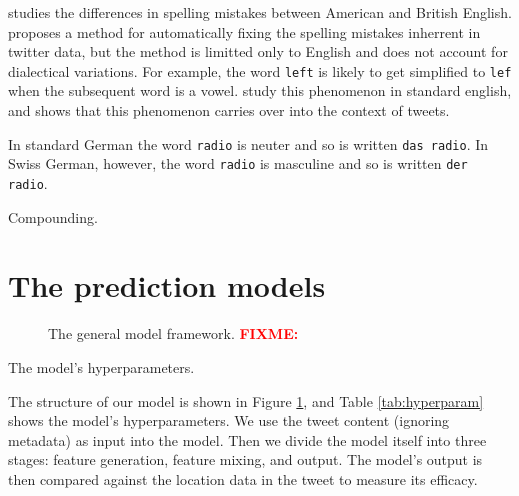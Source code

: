 \documentclass[sigconf,10pt]{acmart}
\newcommand{\str}[1]{\texttt{#1}}
\newcommand{\fixme}[1]{\textcolor{red}{\textbf{FIXME:} {#1}}}
\begin{document}
\begin{description}[style=unboxed,leftmargin=0cm]
    \item[Spelling errors.]
        \citep{treiman2000dialect} studies the differences in spelling mistakes between American and British English.
        \citet{ahmed2015lexical} proposes a method for automatically fixing the spelling mistakes inherrent in twitter data,
        but the method is limitted only to English and does not account for dialectical variations.
%
For example, the word \str{left} is likely to get simplified to \str{lef} when the subsequent word is a vowel.
\citet{guy1991contextual,tagliamonte2005new} study this phenomenon in standard english,
and \citet{eisenstein2013phonological} shows that this phenomenon carries over into the context of tweets.

    \item[Relationships between words.]
        In standard German the word \str{radio} is neuter and so is written \str{das radio}.
        In Swiss German, however, the word \str{radio} is masculine and so is written \str{der radio}. \citep{hollenstein2014compilation}

        Compounding.

\end{description}

\section{The prediction models}

\begin{figure}
    \centering
    
    \caption{The general model framework. \fixme{}}
    \label{fig:model}
\end{figure}

\begin{table}
    \centering
    
    \caption{The model's hyperparameters.}
    \label{tab:hyperparam}
\end{table}

The structure of our model is shown in Figure \ref{fig:model},
and Table \ref{tab:hyperparam} shows the model's hyperparameters. 
We use the tweet content (ignoring metadata) as input into the model.
Then we divide the model itself into three stages:
feature generation, feature mixing, and output.
The model's output is then compared against the location data in the tweet to measure its efficacy.
\end{document}
